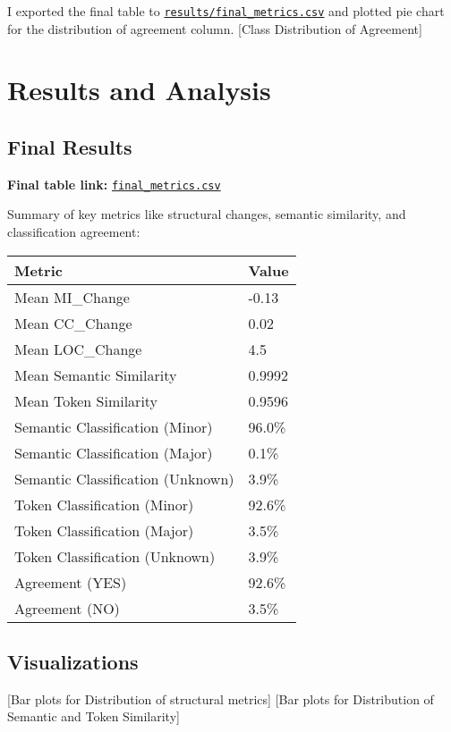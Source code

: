 \documentclass[10pt,a4paper]{report}
\begin{document}
I exported the final table to \href{https://github.com/ShardulJunagade/cs202-stt/blob/main/lab3/results/final_metrics.csv}{\texttt{results/final\_metrics.csv}} and plotted pie chart for the distribution of agreement column.
[Class Distribution of Agreement]

\section{Results and Analysis}

\subsection{Final Results}

\textbf{Final table link:} \href{https://github.com/ShardulJunagade/cs202-stt/blob/main/lab3/results/final_metrics.csv}{\texttt{final\_metrics.csv}}

Summary of key metrics like structural changes, semantic similarity, and classification agreement:

\begin{table}[h!]
\centering
\begin{tabular}{|l|l|}
\hline
Metric & Value \\
\hline
Mean MI\_Change & -0.13 \\
Mean CC\_Change & 0.02 \\
Mean LOC\_Change & 4.5 \\
\hline
Mean Semantic Similarity & 0.9992 \\
Mean Token Similarity & 0.9596 \\
\hline
Semantic Classification (Minor) & 96.0\% \\
Semantic Classification (Major) & 0.1\% \\
Semantic Classification (Unknown) & 3.9\% \\
\hline
Token Classification (Minor) & 92.6\% \\
Token Classification (Major) & 3.5\% \\
Token Classification (Unknown) & 3.9\% \\
\hline
Agreement (YES) & 92.6\% \\
Agreement (NO) & 3.5\% \\
\hline
\end{tabular}
\end{table}


\subsection{Visualizations}
[Bar plots for Distribution of structural metrics]
[Bar plots for Distribution of Semantic and Token Similarity]
\end{document}
